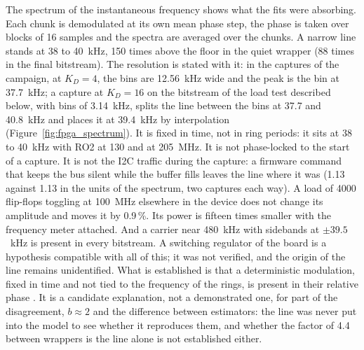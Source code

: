 The spectrum of the instantaneous frequency shows what the fits were
absorbing. Each chunk is demodulated at its own mean phase step, the
phase is taken over blocks of 16 samples and the spectra are averaged
over the chunks. A narrow line stands at 38 to 40~kHz, 150 times above
the floor in the quiet wrapper (88 times in the final bitstream). The
resolution is stated with it: in the captures of the campaign, at
$K_D = 4$, the bins are 12.56~kHz wide and the peak is the bin at
37.7~kHz; a capture at $K_D = 16$ on the bitstream of the load test
described below, with bins of 3.14~kHz, splits the line between the bins
at 37.7 and 40.8~kHz and places it at 39.4~kHz by interpolation
(Figure~\ref{fig:fpga_spectrum}). It is fixed in time,
not in ring periods: it sits at 38 to 40~kHz with RO2 at 130 and at
205~MHz. It is not phase-locked to the start of a capture. It is not the
\ac{I2C} traffic during the capture: a firmware command that keeps the
bus silent while the buffer fills leaves the line where it was (1.13
against 1.13 in the units of the spectrum, two captures each way). A
load of 4000 flip-flops toggling at 100~MHz elsewhere in the device does
not change its amplitude and moves it by 0.9\,\%. Its power is fifteen
times smaller with the frequency meter attached. And a carrier near
480~kHz with sidebands at $\pm39.5$~kHz is present in every bitstream. A
switching regulator of the board is a hypothesis compatible with all of
this; it was not verified, and the origin of the line remains
unidentified. What is established is that a deterministic modulation,
fixed in time and not tied to the frequency of the rings, is present in
their relative phase \meas{}. It is a candidate explanation, not a
demonstrated one, for part of the disagreement, $b \approx 2$ and the
difference between estimators: the line was never put into the model to
see whether it reproduces them, and whether the factor of 4.4 between
wrappers is the line alone is not established either.

